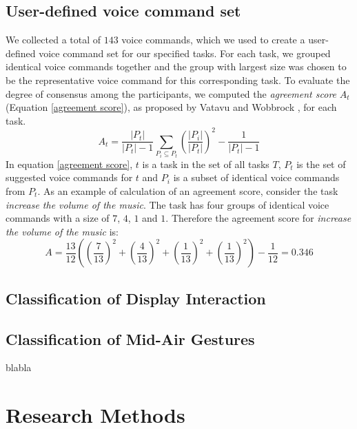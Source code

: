 \documentclass[sigchi]{acmart}
\begin{document}
\subsection{User-defined voice command set}
We collected a total of $143$ voice commands, which we used to create a user-defined voice command set for our specified tasks. For each task, we grouped identical voice commands together and the group with largest size was chosen to be the representative voice command for this corresponding task. To evaluate the degree of consensus among the participants, we computed the \textit{agreement score} $A_t$ (Equation \ref{agreement score}), as proposed by Vatavu and Wobbrock \cite{Vatavu.2015}, for each task.
\begin{equation}
\label{agreement score}
	A_t = \frac{|P_t|}{|P_t|-1} \sum_{P_i \subseteq P_t} \left(\frac{|P_i|}{|P_t|}\right)^2  - \frac{1}{|P_t|-1}
\end{equation}
In equation \ref{agreement score}, $t$ is a task in the set of all tasks $T$, $P_t$ is the set of suggested voice commands for $t$ and $P_i$ is a subset of identical voice commands from $P_t$.
As an example of calculation of an agreement score, consider the task \textit{increase the volume of the music}. The task has four groups of identical voice commands with a size of $7$, $4$, $1$ and $1$. Therefore the agreement score for \textit{increase the volume of the music} is:
\begin{equation}
	A = \frac{13}{12} \left(\left(\frac{7}{13}\right)^2 + \left(\frac{4}{13}\right)^2 + \left(\frac{1}{13}\right)^2 + \left(\frac{1}{13}\right)^2 \right)- \frac{1}{12} = 0.346
\end{equation}
\subsection{Classification of Display Interaction}
\subsection{Classification of Mid-Air Gestures}
blabla








\appendix

\section{Research Methods}
\end{document}
